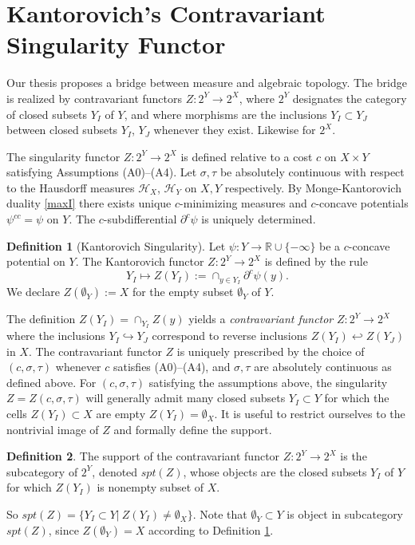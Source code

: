 \documentclass[12pt]{amsart}
\theoremstyle{definition}
\newtheorem{dfn}{Definition}
\theoremstyle{remark}
\newcommand{\bR}{\mathbb{R}}
\newcommand{\del}{\partial}
\newcommand{\ysub}{\del^c \psi(y)}
\begin{document}
\section{Kantorovich's Contravariant Singularity Functor}\label{ks-1}
Our thesis proposes a bridge between measure and algebraic topology. The bridge is realized by  contravariant functors $Z: 2^Y \to 2^X$, where $2^Y$ designates the category of closed subsets $Y_I$ of $Y$, and where morphisms are the inclusions $Y_I \subset Y_J$ between closed subsets $Y_I$, $Y_J$ whenever they exist. Likewise for $2^X$. 

The singularity functor $Z: 2^Y \to 2^X$ is defined relative to a cost $c$ on $X \times Y$ satisfying Assumptions (A0)--(A4). Let $\sigma, \tau$ be absolutely continuous with respect to the Hausdorff measures $\mathscr{H}_X$, $\mathscr{H}_Y$ on $X, Y$ respectively. By Monge-Kantorovich duality \ref{maxI} there exists unique $c$-minimizing measures and $c$-concave potentials $\psi^{cc}=\psi$ on $Y$. The $c$-subdifferential $\del^c \psi$ is uniquely determined.

\begin{dfn}[Kantorovich Singularity]
\label{ks} 
Let $\psi: Y\to \bR \cup \{-\infty\}$ be a $c$-concave potential on $Y$. The Kantorovich functor $Z: 2^Y \to 2^X$ is defined by the rule 
$$Y_I\mapsto Z(Y_I):=\cap_{y\in Y_I} \ysub.$$ We declare $Z(\emptyset_Y):=X$ for the empty subset $\emptyset_Y$ of $Y$.
\end{dfn}

The definition $Z(Y_I)=\cap_{Y_I} Z(y)$ yields a \textit{contravariant functor} $Z:2^Y \to 2^X$ where the inclusions $Y_I \hookrightarrow Y_J$ correspond to reverse inclusions $Z(Y_I) \hookleftarrow Z(Y_J)$ in $X$. The contravariant functor $Z$ is uniquely prescribed by the choice of $(c, \sigma, \tau)$ whenever $c$ satisfies (A0)--(A4), and $\sigma, \tau$ are absolutely continuous as defined above. For $(c, \sigma, \tau)$ satisfying the assumptions above, the singularity $Z=Z(c, \sigma, \tau)$ will generally admit many closed subsets $Y_I \subset Y$ for which the cells $Z(Y_I)\subset X$ are empty $Z(Y_I)=\emptyset_X$. It is useful to restrict ourselves to the nontrivial image of $Z$ and formally define the support. 

\begin{dfn}
The support of the contravariant functor $Z: 2^Y \to 2^X$ is the subcategory of $2^Y$, denoted $spt(Z)$, whose objects are the closed subsets $Y_I$ of $Y$ for which $Z(Y_I)$ is nonempty subset of $X$. 
\end{dfn}
So $spt(Z)=\{Y_I \subset Y|~ Z(Y_I) \neq \emptyset_X\}.$ 
Note that $\emptyset_Y \subset Y$ is object in subcategory $spt(Z)$, since $Z(\emptyset_Y)=X$ according to Definition \ref{ks}. 
\end{document}
